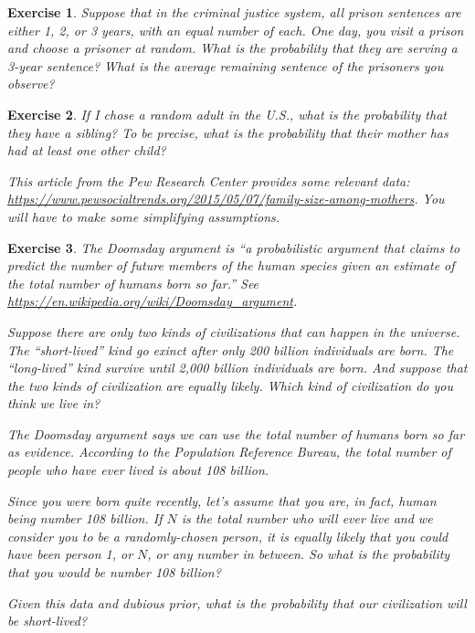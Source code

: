 \documentclass[12pt]{book}
\theoremstyle{exercise}
\newtheorem{exercise}{Exercise}[chapter]
\begin{document}
\begin{exercise}
Suppose that in the criminal justice system, all prison sentences are either 1, 2, or 3 years, with an equal number of each.  One day, you visit a prison and choose a prisoner at random.  What is the probability that they are serving a 3-year sentence?  What is the average remaining sentence of the prisoners you observe?
\end{exercise}


\begin{exercise}
If I chose a random adult in the U.S., what is the probability that they have a sibling? To be precise, what is the probability that their mother has had at least one other child?

This article from the Pew Research Center provides some relevant data: \url{https://www.pewsocialtrends.org/2015/05/07/family-size-among-mothers}.  You will have to make some simplifying assumptions.
\end{exercise}


\begin{exercise}
The Doomsday argument is ``a probabilistic argument that claims to predict the number of future members of the human species given an estimate of the total number of humans born so far.''  See \url{https://en.wikipedia.org/wiki/Doomsday_argument}.

Suppose there are only two kinds of civilizations that can happen in the universe. The ``short-lived'' kind go exinct after only 200 billion individuals are born. The ``long-lived'' kind survive until 2,000 billion individuals are born. And suppose that the two kinds of civilization are equally likely.  Which kind of civilization do you think we live in?

The Doomsday argument says we can use the total number of humans born so far as evidence.
According to the Population Reference Bureau, the total number of people who have ever lived is about 108 billion.

Since you were born quite recently, let's assume that you are, in fact, human being number 108 billion.
If $N$ is the total number who will ever live and we consider you to be a randomly-chosen person, it is equally likely that you could have been person 1, or $N$, or any number in between.
So what is the probability that you would be number 108 billion?

Given this data and dubious prior, what is the probability that our civilization will be short-lived?

\end{exercise}
\end{document}
